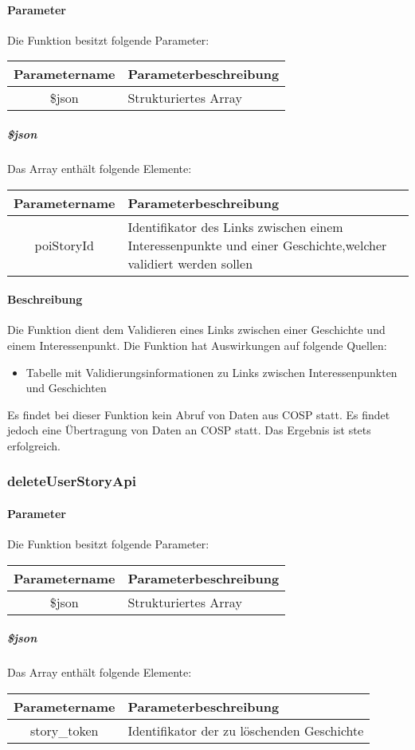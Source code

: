 \paragraph{Parameter} Die Funktion besitzt folgende Parameter:
\begin{table}[H]
	\begin{tabular}{|c|p{11cm}|}
		\hline
		\textbf{Parametername} & \textbf{Parameterbeschreibung} \\ \hline
		\$json & Strukturiertes Array \\ \hline
	\end{tabular}
\end{table}
\subparagraph{\$json}Das Array enthält folgende Elemente:
\begin{table}[H]
	\begin{tabular}{|c|p{11cm}|}
		\hline
		\textbf{Parametername} & \textbf{Parameterbeschreibung} \\ \hline
		poiStoryId & Identifikator des Links zwischen einem Interessenpunkte und einer Geschichte,welcher validiert werden sollen \\ \hline
	\end{tabular}
\end{table}
\paragraph{Beschreibung} Die Funktion dient dem Validieren eines Links zwischen einer Geschichte und einem Interessenpunkt. Die Funktion hat Auswirkungen auf folgende Quellen:
\begin{itemize}
	\item Tabelle mit Validierungsinformationen zu Links zwischen Interessenpunkten und Geschichten
\end{itemize}
Es findet bei dieser Funktion kein Abruf von Daten aus {\glqq COSP\grqq} statt. Es findet jedoch eine Übertragung von Daten an {\glqq COSP\grqq} statt. Das Ergebnis ist stets erfolgreich.
\subsubsection{deleteUserStoryApi}
\paragraph{Parameter} Die Funktion besitzt folgende Parameter:
\begin{table}[H]
	\begin{tabular}{|c|p{11cm}|}
		\hline
		\textbf{Parametername} & \textbf{Parameterbeschreibung} \\ \hline
		\$json & Strukturiertes Array \\ \hline
	\end{tabular}
\end{table}
\subparagraph{\$json}Das Array enthält folgende Elemente:
\begin{table}[H]
	\begin{tabular}{|c|p{11cm}|}
		\hline
		\textbf{Parametername} & \textbf{Parameterbeschreibung} \\ \hline
		story\_token & Identifikator der zu löschenden Geschichte \\ \hline
	\end{tabular}
\end{table}

